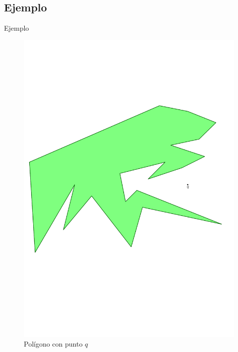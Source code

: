 \documentclass[aspectratio=169,xcolor=dvipsnames, t]{beamer}
\begin{document}
\subsection{Ejemplo}
\begin{frame}{Ejemplo}
  \begin{figure}
    \centering
    \includegraphics[width=1\linewidth, height=.75\textheight, page=1, keepaspectratio]{IPE/point_visibility.pdf}
    \caption{Polígono con punto $q$}
  \end{figure}
\end{frame}
\end{document}
